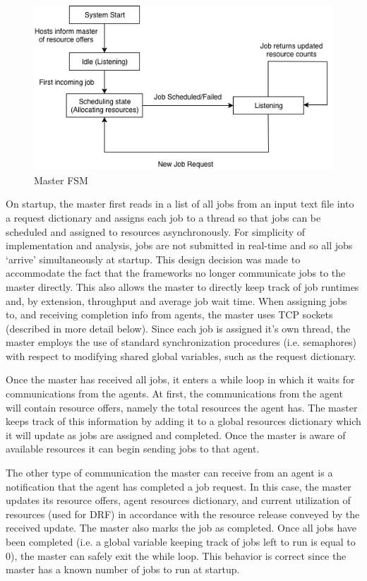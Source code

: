 \documentclass{hotnets19}
\begin{document}
\begin{figure}[!tbh]
    \centering
    \includegraphics[width=\columnwidth]{hotnets19-template/master.png}
    \caption{Master FSM}
    \label{fig:master_fsm}
\end{figure}

On startup, the master first reads in a list of all jobs from an input text file into a request dictionary and assigns each job to a thread so that jobs can be scheduled and assigned to resources asynchronously. For simplicity of implementation and analysis, jobs are not submitted in real-time and so all jobs `arrive' simultaneously at startup. This design decision was made to accommodate the fact that the frameworks no longer communicate jobs to the master directly. This also allows the master to directly keep track of job runtimes and, by extension, throughput and average job wait time. When assigning jobs to, and receiving completion info from agents, the master uses TCP sockets (described in more detail below). Since each job is assigned it's own thread, the master employs the use of standard synchronization procedures (i.e. semaphores) with respect to modifying shared global variables, such as the request dictionary.

Once the master has received all jobs, it enters a while loop in which it waits for communications from the agents. At first, the communications from the agent will contain resource offers, namely the total resources the agent has. The master keeps track of this information by adding it to a global resources dictionary which it will update as jobs are assigned and completed. Once the master is aware of available resources it can begin sending jobs to that agent.

The other type of communication the master can receive from an agent is a notification that the agent has completed a job request. In this case, the master updates its resource offers, agent resources dictionary, and current utilization of resources (used for DRF) in accordance with the resource release conveyed by the received update. The master also marks the job as completed. Once all jobs have been completed (i.e. a global variable keeping track of jobs left to run is equal to 0), the master can safely exit the while loop. This behavior is correct since the master has a known number of jobs to run at startup.
\end{document}
